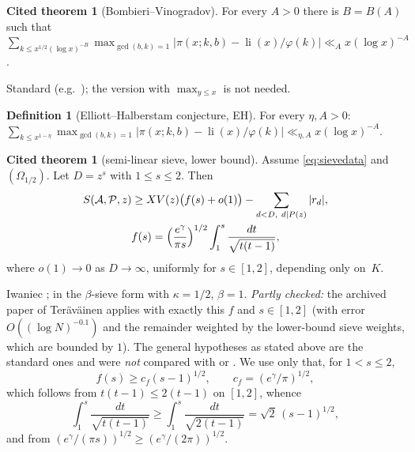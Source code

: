 \documentclass[11pt,reqno]{amsart}
\theoremstyle{definition}
\newtheorem{definition}[theorem]{Definition}
\newtheorem{citedthm}[theorem]{Cited theorem}
\newcommand{\li}{\operatorname{li}}
\begin{document}
\begin{citedthm}[Bombieri--Vinogradov]\label{cit:BV}
For every $A>0$ there is $B=B(A)$ such that
$\sum_{k\le x^{1/2}(\log x)^{-B}}\max_{\gcd(b,k)=1}|\pi(x;k,b)-\li(x)/\varphi(k)|\ll_A x(\log x)^{-A}$.
\end{citedthm}
\noindent Standard (e.g.\ \cite[Thm.~17.1]{IK}); the version with
$\max_{y\le x}$ is not needed.

\begin{definition}[Elliott--Halberstam conjecture, EH]\label{def:EH}
For every $\eta,A>0$:
$\sum_{k\le x^{1-\eta}}\max_{\gcd(b,k)=1}|\pi(x;k,b)-\li(x)/\varphi(k)|\ll_{\eta,A}x(\log x)^{-A}$.
\end{definition}

\begin{citedthm}[semi-linear sieve, lower bound]\label{cit:semi}
Assume \eqref{eq:sievedata} and $(\Omega_{1/2})$.  Let $D=z^s$ with
$1\le s\le2$.  Then
\begin{gather*}
 S(\mathcal A,\mathcal P,z)\ge XV(z)\bigl(f(s)+o(1)\bigr)-\sum_{d<D,\ d\mid P(z)}|r_d|,\\
 f(s)=\Bigl(\frac{e^\gamma}{\pi s}\Bigr)^{1/2}\int_1^s\frac{dt}{\sqrt{t(t-1)}},
\end{gather*}
where $o(1)\to0$ as $D\to\infty$, uniformly for $s\in[1,2]$, depending
only on~$K$.
\end{citedthm}
\noindent Iwaniec \cite{Iw76}; in the $\beta$-sieve form
\cite[Thm.~11.13]{OdC} with $\kappa=1/2$, $\beta=1$.  \emph{Partly checked:}
the archived paper of Ter\"av\"ainen \cite[(6.4)]{Ter} applies
\cite[Thm.~11.13]{OdC} with exactly this $f$ and $s\in[1,2]$ (with error
$O((\log N)^{-0.1})$ and the remainder weighted by the lower-bound sieve
weights, which are bounded by $1$).  The general hypotheses as stated
above are the standard ones and were \emph{not} compared with
\cite{OdC} or \cite{Iw76}.  We use only that, for $1<s\le2$,
\begin{equation}\label{eq:fsemi}
 f(s)\ge c_f(s-1)^{1/2},\qquad c_f=(e^\gamma/\pi)^{1/2},
\end{equation}
which follows from $t(t-1)\le2(t-1)$ on $[1,2]$, whence
\[
 \int_1^s\frac{dt}{\sqrt{t(t-1)}}\ge\int_1^s\frac{dt}{\sqrt{2(t-1)}}=\sqrt2\,(s-1)^{1/2},
\]
and from $(e^\gamma/(\pi s))^{1/2}\ge(e^\gamma/(2\pi))^{1/2}$.
\end{document}
